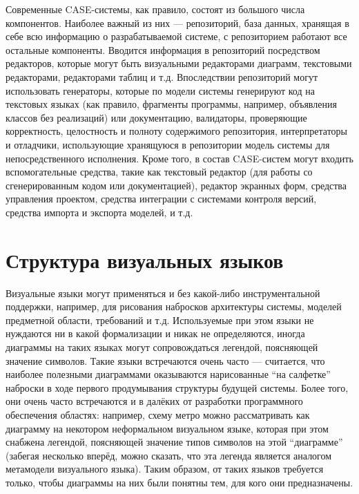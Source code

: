 Современные \ac{CASE}-системы, как правило, состоят из большого числа компонентов. 
Наиболее важный из них --- репозиторий, база данных, хранящая в себе всю 
информацию о разрабатываемой системе, с репозиторием работают все остальные 
компоненты. Вводится информация в репозиторий посредством редакторов, которые 
могут быть визуальными редакторами диаграмм, текстовыми редакторами, редакторами 
таблиц и т.д. Впоследствии репозиторий могут использовать генераторы, которые по 
модели системы генерируют код на текстовых языках (как правило, фрагменты 
программы, например, объявления классов без реализаций) или документацию, 
валидаторы, проверяющие корректность, целостность и полноту содержимого 
репозитория, интерпретаторы и отладчики, использующие хранящуюся в репозитории 
модель системы для непосредственного исполнения. Кроме того, в состав 
\ac{CASE}-систем могут входить вспомогательные средства, такие как текстовый редактор 
(для работы со сгенерированным кодом или документацией), редактор экранных форм, 
средства управления проектом, средства интеграции с системами контроля версий, 
средства импорта и экспорта моделей, и т.д.

\section{Структура визуальных языков}
Визуальные языки могут применяться и без какой-либо инструментальной поддержки, 
например, для рисования набросков архитектуры системы, моделей предметной 
области, требований и т.д. Используемые при этом языки не нуждаются ни в какой 
формализации и никак не определяются, иногда диаграммы на таких языках могут 
сопровождаться легендой, поясняющей значение символов. Такие языки встречаются 
очень часто --- считается, что наиболее полезными диаграммами оказываются 
нарисованные "`на салфетке"' наброски в ходе первого продумывания структуры 
будущей системы. Более того, они очень часто встречаются и в далёких от 
разработки программного обеспечения областях: например, схему метро можно 
рассматривать как диаграмму на некотором неформальном визуальном языке, которая 
при этом снабжена легендой, поясняющей значение типов символов на этой 
"`диаграмме"' (забегая несколько вперёд, можно сказать, что эта легенда является 
аналогом метамодели визуального языка). Таким образом, от таких языков требуется 
только, чтобы диаграммы на них были понятны тем, для кого они предназначены.

